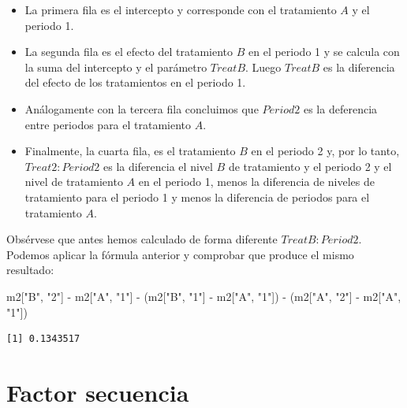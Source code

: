 \documentclass[
  12pt,
  a4paper,
  extrafontsizes,
  onecolumn,
  openright,
  table]{memoir}
\newenvironment{Shaded}{\begin{snugshade}}{\end{snugshade}}
\newcommand{\NormalTok}[1]{\textcolor[rgb]{0.00,0.23,0.31}{#1}}
\newcommand{\SpecialCharTok}[1]{\textcolor[rgb]{0.37,0.37,0.37}{#1}}
\newcommand{\StringTok}[1]{\textcolor[rgb]{0.13,0.47,0.30}{#1}}
\providecommand{\tightlist}{%
  \setlength{\itemsep}{0pt}\setlength{\parskip}{0pt}}\usepackage{longtable,booktabs,array}
\begin{document}
\normalsize

\begin{itemize}
\tightlist
\item
  La primera fila es el intercepto y corresponde con el tratamiento
  \(A\) y el periodo 1.
\item
  La segunda fila es el efecto del tratamiento \(B\) en el periodo 1 y
  se calcula con la suma del intercepto y el parámetro \(TreatB\). Luego
  \(TreatB\) es la diferencia del efecto de los tratamientos en el
  periodo 1.
\item
  Análogamente con la tercera fila concluimos que \(Period2\) es la
  deferencia entre periodos para el tratamiento \(A\).
\item
  Finalmente, la cuarta fila, es el tratamiento \(B\) en el periodo 2 y,
  por lo tanto, \(Treat2:Period2\) es la diferencia el nivel \(B\) de
  tratamiento y el periodo 2 y el nivel de tratamiento \(A\) en el
  periodo 1, menos la diferencia de niveles de tratamiento para el
  periodo 1 y menos la diferencia de periodos para el tratamiento \(A\).
\end{itemize}

Obsérvese que antes hemos calculado de forma diferente
\(TreatB:Period2\). Podemos aplicar la fórmula anterior y comprobar que
produce el mismo resultado:

\scriptsize

\begin{Shaded}
\begin{Highlighting}[]
\NormalTok{m2[}\StringTok{"B"}\NormalTok{, }\StringTok{"2"}\NormalTok{] }\SpecialCharTok{{-}}\NormalTok{ m2[}\StringTok{"A"}\NormalTok{, }\StringTok{"1"}\NormalTok{] }\SpecialCharTok{{-}}\NormalTok{ (m2[}\StringTok{"B"}\NormalTok{, }\StringTok{"1"}\NormalTok{] }\SpecialCharTok{{-}}\NormalTok{ m2[}\StringTok{"A"}\NormalTok{, }\StringTok{"1"}\NormalTok{]) }\SpecialCharTok{{-}}\NormalTok{ (m2[}\StringTok{"A"}\NormalTok{, }\StringTok{"2"}\NormalTok{] }\SpecialCharTok{{-}}\NormalTok{ m2[}\StringTok{"A"}\NormalTok{, }\StringTok{"1"}\NormalTok{])}
\end{Highlighting}
\end{Shaded}

\begin{verbatim}
[1] 0.1343517
\end{verbatim}

\normalsize

\hypertarget{factor-secuencia}{%
\section{Factor secuencia}\label{factor-secuencia}}
\end{document}
